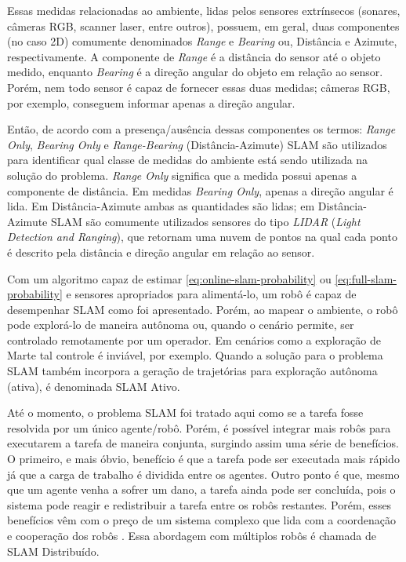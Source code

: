 Essas medidas relacionadas ao ambiente, lidas pelos sensores extrínsecos 
(sonares, câmeras RGB, scanner laser, entre outros), possuem, em geral, duas 
componentes (no caso 2D) comumente denominados \textit{Range} e \textit{Bearing} ou, Distância e Azimute, respectivamente. 
A componente de \textit{Range} é a distância do sensor até o objeto medido, 
enquanto \textit{Bearing} é a direção angular do objeto em relação ao sensor. 
Porém, nem todo sensor é capaz de fornecer essas duas medidas; câmeras RGB, por 
exemplo, conseguem  informar apenas a direção angular.

Então, de acordo com a presença/ausência dessas componentes os termos: 
\textit{Range Only}, \textit{Bearing Only} e \textit{Range-Bearing} (Distância-Azimute) SLAM são 
utilizados para identificar qual classe de medidas do ambiente está sendo
utilizada na solução do problema. \textit{Range Only} significa que a medida 
possui apenas a 
componente de distância. Em medidas \textit{Bearing Only}, apenas a direção 
angular é lida. Em Distância-Azimute ambas as quantidades são lidas; em 
Distância-Azimute SLAM são comumente utilizados sensores do tipo 
\emph{LIDAR} (\textit{Light Detection and Ranging}), que retornam uma nuvem de 
pontos na qual cada ponto é descrito pela distância e direção angular em relação ao 
sensor.

Com um algoritmo capaz de estimar \ref{eq:online-slam-probability} ou 
\ref{eq:full-slam-probability} e sensores apropriados para alimentá-lo, 
um robô é capaz de desempenhar SLAM como foi apresentado. Porém, ao mapear 
o ambiente, o robô pode explorá-lo de maneira autônoma ou, quando 
o cenário permite, ser controlado remotamente por um operador. Em cenários 
como a exploração de Marte tal controle é inviável, por exemplo. Quando a 
solução para o problema SLAM também incorpora a geração de trajetórias para exploração autônoma (ativa), é denominada SLAM Ativo.

Até o momento, o problema SLAM foi tratado aqui como se a tarefa fosse resolvida 
por um único agente/robô. Porém, é possível integrar mais robôs para executarem 
a tarefa de maneira conjunta, surgindo assim uma série de benefícios. O primeiro, 
e mais óbvio, benefício é que a tarefa pode ser executada mais rápido já que a 
carga de trabalho é dividida entre os agentes. Outro ponto é que, mesmo que um 
agente venha a sofrer um dano, a tarefa ainda pode ser concluída, pois o sistema 
pode reagir e redistribuir a tarefa entre os robôs restantes. Porém, esses 
benefícios vêm com o preço de um sistema complexo que lida com a 
coordenação e cooperação dos robôs \cite{saeedi2016multiple}. Essa abordagem com 
múltiplos robôs é chamada de SLAM Distribuído.

